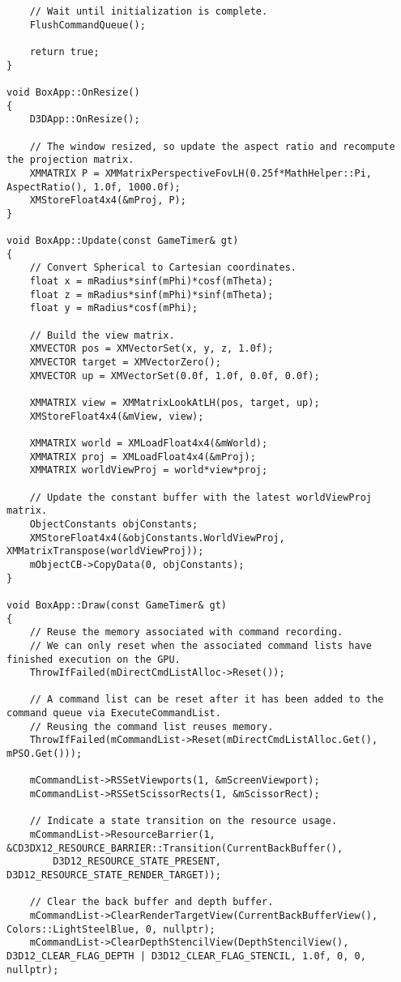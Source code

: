 \begin{lstlisting}
    // Wait until initialization is complete.
    FlushCommandQueue();

    return true;
}

void BoxApp::OnResize()
{
    D3DApp::OnResize();

    // The window resized, so update the aspect ratio and recompute the projection matrix.
    XMMATRIX P = XMMatrixPerspectiveFovLH(0.25f*MathHelper::Pi, AspectRatio(), 1.0f, 1000.0f);
    XMStoreFloat4x4(&mProj, P);
}

void BoxApp::Update(const GameTimer& gt)
{
    // Convert Spherical to Cartesian coordinates.
    float x = mRadius*sinf(mPhi)*cosf(mTheta);
    float z = mRadius*sinf(mPhi)*sinf(mTheta);
    float y = mRadius*cosf(mPhi);

    // Build the view matrix.
    XMVECTOR pos = XMVectorSet(x, y, z, 1.0f);
    XMVECTOR target = XMVectorZero();
    XMVECTOR up = XMVectorSet(0.0f, 1.0f, 0.0f, 0.0f);

    XMMATRIX view = XMMatrixLookAtLH(pos, target, up);
    XMStoreFloat4x4(&mView, view);

    XMMATRIX world = XMLoadFloat4x4(&mWorld);
    XMMATRIX proj = XMLoadFloat4x4(&mProj);
    XMMATRIX worldViewProj = world*view*proj;

    // Update the constant buffer with the latest worldViewProj matrix.
    ObjectConstants objConstants;
    XMStoreFloat4x4(&objConstants.WorldViewProj, XMMatrixTranspose(worldViewProj));
    mObjectCB->CopyData(0, objConstants);
}

void BoxApp::Draw(const GameTimer& gt)
{
    // Reuse the memory associated with command recording.
    // We can only reset when the associated command lists have finished execution on the GPU.
    ThrowIfFailed(mDirectCmdListAlloc->Reset());

    // A command list can be reset after it has been added to the command queue via ExecuteCommandList.
    // Reusing the command list reuses memory.
    ThrowIfFailed(mCommandList->Reset(mDirectCmdListAlloc.Get(), mPSO.Get()));

    mCommandList->RSSetViewports(1, &mScreenViewport);
    mCommandList->RSSetScissorRects(1, &mScissorRect);

    // Indicate a state transition on the resource usage.
    mCommandList->ResourceBarrier(1, &CD3DX12_RESOURCE_BARRIER::Transition(CurrentBackBuffer(),
        D3D12_RESOURCE_STATE_PRESENT, D3D12_RESOURCE_STATE_RENDER_TARGET));

    // Clear the back buffer and depth buffer.
    mCommandList->ClearRenderTargetView(CurrentBackBufferView(), Colors::LightSteelBlue, 0, nullptr);
    mCommandList->ClearDepthStencilView(DepthStencilView(), D3D12_CLEAR_FLAG_DEPTH | D3D12_CLEAR_FLAG_STENCIL, 1.0f, 0, 0, nullptr);
    

\end{lstlisting}
